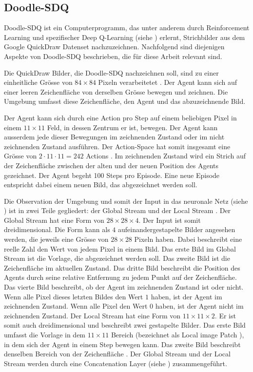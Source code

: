 \subsection{Doodle-SDQ}\label{sub:t_ver_dood} Doodle-SDQ ist ein
Computerprogramm, das unter anderem durch Reinforcement Learning und
spezifischer Deep Q-Learning (siehe ) erlernt,
Strichbilder aus dem Google QuickDraw Datenset \cite{noauthor_quick_2022}
nachzuzeichnen. Nachfolgend sind diejenigen Aspekte von Doodle-SDQ beschrieben,
die für diese Arbeit relevant sind.
 
Die QuickDraw Bilder, die Doodle-SDQ nachzeichnen soll, sind zu einer
einheitliche Grösse von $84\times84$ Pixeln verarbeitetet \cite[S.
7]{zhou_learning_2018}. Der Agent kann sich auf einer leeren Zeichenfläche von
derselben Grösse bewegen und zeichnen. Die Umgebung umfasst diese
Zeichenfläche, den Agent und das abzuzeichnende Bild.
 
Der Agent kann sich durch eine Action pro Step auf einem beliebigen Pixel in
einem $11\times11$ Feld, in dessen Zentrum er ist, bewegen. Der Agent kann
ausserdem jede dieser Bewegungen im zeichnenden Zustand oder im nicht
zeichnenden Zustand ausführen. Der Action-Space hat somit insgesamt eine Grösse
von $2\cdot11\cdot11 = 242$ Actions \cite[S. 5]{zhou_learning_2018}. Im
zeichnenden Zustand wird ein Strich auf der Zeichenfläche zwischen der alten und
der neuen Position des Agents gezeichnet. Der Agent begeht 100 Steps pro
Episode. Eine neue Episode entspricht dabei einem neuen Bild, das abgezeichnet
werden soll.
 
Die Observation der Umgebung und somit der Input in das neuronale Netz (siehe
) ist in zwei Teile gegliedert: der Global Stream und
der Local Stream \cite[S. 4]{zhou_learning_2018}. Der Global Stream hat eine
Form von $28\times28\times4$. Der Input ist somit dreidimensional. Die Form kann
als $4$ aufeinandergestapelte Bilder angesehen werden, die jeweils eine Grösse
von $28\times28$ Pixeln haben. Dabei beschreibt eine reelle Zahl den Wert von
jedem Pixel in einem Bild. Das erste Bild im Global Stream ist die Vorlage, die
abgezeichnet werden soll. Das zweite Bild ist die Zeichenfläche im aktuellen
Zustand. Das dritte Bild beschreibt die Position des Agents durch seine relative
Entfernung zu jedem Punkt auf der Zeichenfläche. Das vierte Bild beschreibt, ob
der Agent im zeichnenden Zustand ist oder nicht. Wenn alle Pixel dieses letzten
Bildes den Wert $1$ haben, ist der Agent im zeichnenden Zustand. Wenn alle Pixel
den Wert $0$ haben, ist der Agent nicht im zeichnenden Zustand. Der Local Stream
hat eine Form von $11\times11\times2$. Er ist somit auch dreidimensional und
beschreibt zwei gestapelte Bilder. Das erste Bild umfasst die Vorlage in dem
$11\times11$ Bereich (bezeichnet als Local image Patch \cite[S.
5]{zhou_learning_2018}), in dem sich der Agent in einem Step bewegen kann. Das
zweite Bild beschreibt denselben Bereich von der Zeichenfläche \cite[S. 4
ff.]{zhou_learning_2018}. Der Global Stream und der Local Stream werden durch
eine Concatenation Layer (siehe ) zusammengeführt.
 
